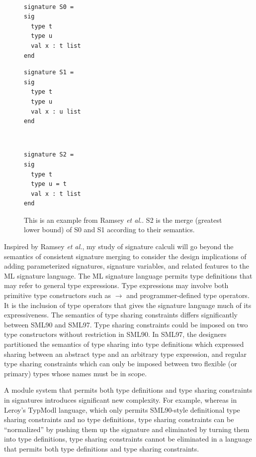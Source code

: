 \documentclass[12pt]{article}
\newcommand{\etal}{{\it et al.}}
\begin{document}
\begin{figure}[ht]
\hrulefill\\
\begin{minipage}[b]{0.5\linewidth}
\begin{lstlisting}[frame=none]
signature S0 =
sig
  type t
  type u 
  val x : t list
end
\end{lstlisting}
\end{minipage}
\hspace{0.1cm}
\begin{minipage}[b]{0.5\linewidth}
\begin{lstlisting}[frame=none]
signature S1 = 
sig
  type t
  type u 
  val x : u list
end	
\end{lstlisting}	
\end{minipage}\\
\begin{lstlisting}[frame=none]
signature S2 =
sig
  type t 
  type u = t
  val x : t list
end	
\end{lstlisting}
\hrulefill
\caption{This is an example from Ramsey \etal \cite{ramsey05}. S2 is the merge (greatest lower bound) of S0 and S1 according to their semantics.}
\label{fig:ramseymerge}
\end{figure}

Inspired by Ramsey \etal, my study of signature calculi will go beyond the semantics of consistent signature merging to consider the design implications of adding parameterized signatures\cite{jones96}, signature variables, and related features to the ML signature language.
The ML signature language permits type definitions that may refer to general type expressions. Type expressions may involve both primitive type constructors such as $\rightarrow$ and programmer-defined type operators. It is the inclusion of type operators that gives the signature language much of its expressiveness. The semantics of type sharing constraints differs significantly between SML90 and SML97. Type sharing constraints could be imposed on two type constructors without restriction in SML90. In SML97, the designers partitioned the semantics of type sharing into type definitions which expressed sharing between an abstract type and an arbitrary type expression, and regular type sharing constraints which can only be imposed between two flexible (or primary) types whose names must be in scope. 

				A module system that permits both type definitions and type sharing constraints in signatures introduces significant new complexity. For example, whereas in Leroy's \cite{Leroy:generativity} TypModl language, which only permits SML90-style definitional type sharing constraints and no type definitions, type sharing constraints can be ``normalized'' by pushing them up the signature and eliminated by turning them into type definitions, type sharing constraints cannot be eliminated in a language that permits both type definitions and type sharing constraints. 
\end{document}
